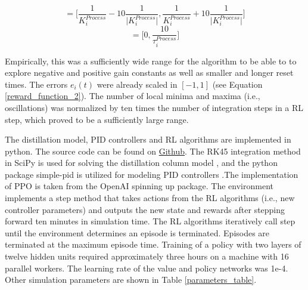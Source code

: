 \begin{equation}
	[K_i^{P, low}, K_i^{P, high}] = \Biggl [\frac{1}{ K_i^{Process}}-10 \frac{1}{\vert K_i^{Process} \vert}, \frac{1}{K_i^{Process}}+10 \frac{1}{\vert K_i^{Process} \vert}\Biggr ]
\end{equation}
\begin{equation}
	[K_i^{I, low}, K_i^{I, high}] = \Biggl [0, \frac{10}{ \tau_i^{Process}}\Biggr ]
\end{equation}

 Empirically, this was a sufficiently wide range for the algorithm to be able to to explore negative and positive gain constants as well as smaller and longer reset times. The errors $e_i(t)$ were already scaled in  $[-1, 1]$ (see Equation \ref{reward_function_2}). The number of local minima and maxima (i.e., oscillations) was normalized by ten times the number of integration steps in a RL step, which proved to be a sufficiently large range. 
 
The distillation model, PID controllers and RL algorithms are implemented in python. The source code can be found on \href{https://github.com/sustainable-processes/distillation_control}{Github}. The RK45 integration method in SciPy is used for solving the distillation column model \cite{2020SciPy-NMeth}, and the python package simple-pid is utilized for modeling PID controllers \cite{Lundberg2019}.The implementation of PPO is taken from the OpenAI spinning up package. The environment implements a step method that takes actions from the RL algorithms (i.e., new controller parameters) and outputs the new state and rewards after stepping forward ten minutes in simulation time. The RL algorithms iteratively call step until the environment determines an episode is terminated. Episodes are terminated at the maximum episode time. Training of a policy with two layers of twelve hidden units required approximately three hours on a machine with 16 parallel workers. The learning rate of the value and policy networks was 1e-4. Other simulation parameters are shown in Table \ref{parameters_table}.

